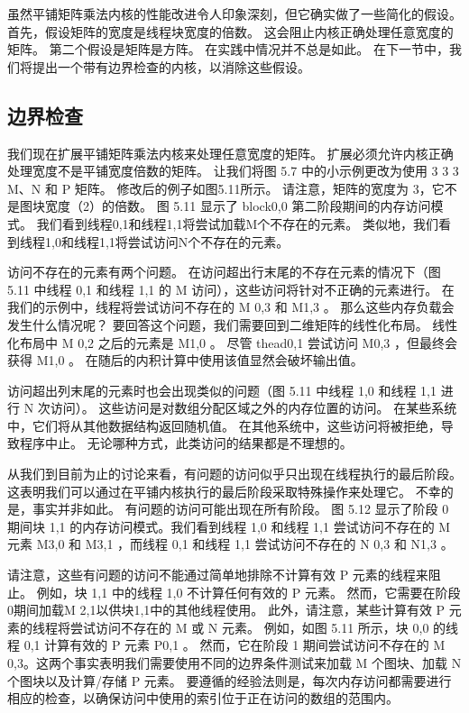 虽然平铺矩阵乘法内核的性能改进令人印象深刻，但它确实做了一些简化的假设。 首先，假设矩阵的宽度是线程块宽度的倍数。 这会阻止内核正确处理任意宽度的矩阵。 第二个假设是矩阵是方阵。 在实践中情况并不总是如此。 在下一节中，我们将提出一个带有边界检查的内核，以消除这些假设。

\subsection{边界检查}
我们现在扩展平铺矩阵乘法内核来处理任意宽度的矩阵。 扩展必须允许内核正确处理宽度不是平铺宽度倍数的矩阵。 让我们将图 5.7 中的小示例更改为使用 3 3 3 M、N 和 P 矩阵。 修改后的例子如图5.11所示。 请注意，矩阵的宽度为 3，它不是图块宽度（2）的倍数。 图 5.11 显示了 block0,0 第二阶段期间的内存访问模式。 我们看到线程0,1和线程1,1将尝试加载M个不存在的元素。 类似地，我们看到线程1,0和线程1,1将尝试访问N个不存在的元素。

访问不存在的元素有两个问题。 在访问超出行末尾的不存在元素的情况下（图 5.11 中线程 0,1 和线程 1,1 的 M 访问），这些访问将针对不正确的元素进行。 在我们的示例中，线程将尝试访问不存在的 M 0,3 和 M1,3 。 那么这些内存负载会发生什么情况呢？ 要回答这个问题，我们需要回到二维矩阵的线性化布局。 线性化布局中 M 0,2 之后的元素是 M1,0 。 尽管 thead0,1 尝试访问 M0,3 ，但最终会获得 M1,0 。 在随后的内积计算中使用该值显然会破坏输出值。

访问超出列末尾的元素时也会出现类似的问题（图 5.11 中线程 1,0 和线程 1,1 进行 N 次访问）。 这些访问是对数组分配区域之外的内存位置的访问。 在某些系统中，它们将从其他数据结构返回随机值。 在其他系统中，这些访问将被拒绝，导致程序中止。 无论哪种方式，此类访问的结果都是不理想的。

从我们到目前为止的讨论来看，有问题的访问似乎只出现在线程执行的最后阶段。 这表明我们可以通过在平铺内核执行的最后阶段采取特殊操作来处理它。 不幸的是，事实并非如此。 有问题的访问可能出现在所有阶段。 图 5.12 显示了阶段 0 期间块 1,1 的内存访问模式。我们看到线程 1,0 和线程 1,1 尝试访问不存在的 M 元素 M3,0 和 M3,1 ，而线程 0,1 和线程 1,1 尝试访问不存在的 N 0,3 和 N1,3 。

请注意，这些有问题的访问不能通过简单地排除不计算有效 P 元素的线程来阻止。 例如，块 1,1 中的线程 1,0 不计算任何有效的 P 元素。 然而，它需要在阶段0期间加载M 2,1以供块1,1中的其他线程使用。 此外，请注意，某些计算有效 P 元素的线程将尝试访问不存在的 M 或 N 元素。 例如，如图 5.11 所示，块 0,0 的线程 0,1 计算有效的 P 元素 P0,1 。 然而，它在阶段 1 期间尝试访问不存在的 M 0,3。这两个事实表明我们需要使用不同的边界条件测试来加载 M 个图块、加载 N 个图块以及计算/存储 P 元素。 要遵循的经验法则是，每次内存访问都需要进行相应的检查，以确保访问中使用的索引位于正在访问的数组的范围内。

